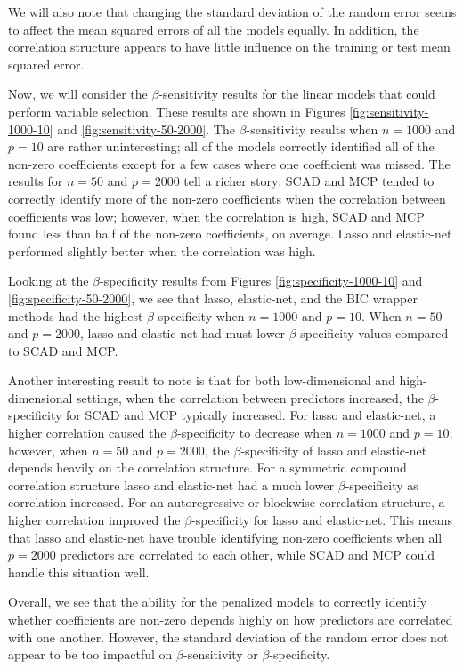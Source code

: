 \documentclass{article}
\begin{document}
We will also note that changing the standard deviation of the random error seems to affect the mean squared errors of all the models equally. In addition, the correlation structure appears to have little influence on the training or test mean squared error.

Now, we will consider the $\beta$-sensitivity results for the linear models that could perform variable selection. These results are shown in Figures \ref{fig:sensitivity-1000-10} and \ref{fig:sensitivity-50-2000}. The $\beta$-sensitivity results when $n = 1000$ and $p = 10$ are rather uninteresting; all of the models correctly identified all of the non-zero coefficients except for a few cases where one coefficient was missed. The results for $n = 50$ and $p = 2000$ tell a richer story: SCAD and MCP tended to correctly identify more of the non-zero coefficients when the correlation between coefficients was low; however, when the correlation is high, SCAD and MCP found less than half of the non-zero coefficients, on average. Lasso and elastic-net performed slightly better when the correlation was high.

Looking at the $\beta$-specificity results from Figures \ref{fig:specificity-1000-10} and \ref{fig:specificity-50-2000}, we see that lasso, elastic-net, and the BIC wrapper methods had the highest $\beta$-specificity when $n = 1000$ and $p = 10$. When $n = 50$ and $p = 2000$, lasso and elastic-net had must lower $\beta$-specificity values compared to SCAD and MCP.

Another interesting result to note is that for both low-dimensional and high-dimensional settings, when the correlation between predictors increased, the $\beta$-specificity for SCAD and MCP typically increased. For lasso and elastic-net, a higher correlation caused the $\beta$-specificity to decrease when $n = 1000$ and $p = 10$; however, when $n = 50$ and $p = 2000$, the $\beta$-specificity of lasso and elastic-net depends heavily on the correlation structure. For a symmetric compound correlation structure lasso and elastic-net had a much lower $\beta$-specificity as correlation increased. For an autoregressive or blockwise correlation structure, a higher correlation improved the $\beta$-specificity for lasso and elastic-net. This means that lasso and elastic-net have trouble identifying non-zero coefficients when all $p = 2000$ predictors are correlated to each other, while SCAD and MCP could handle this situation well.

Overall, we see that the ability for the penalized models to correctly identify whether coefficients are non-zero depends highly on how predictors are correlated with one another. However, the standard deviation of the random error does not appear to be too impactful on $\beta$-sensitivity or $\beta$-specificity.
\end{document}
